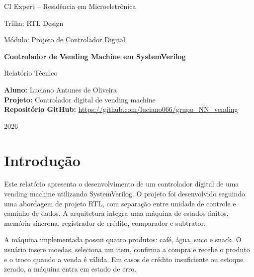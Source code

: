 \documentclass[11pt,a4paper]{article}
\begin{document}
\begin{titlepage}
    \centering

    {\large CI Expert -- Residência em Microeletrônica\par}
    {\large Trilha: RTL Design\par}
    {\large Módulo: Projeto de Controlador Digital\par}

    \vspace{3cm}

    {\LARGE \textbf{Controlador de Vending Machine em SystemVerilog}\par}

    \vspace{1cm}

    {\large Relatório Técnico\par}

    \vfill

    \begin{flushleft}
    \textbf{Aluno:} Luciano Antunes de Oliveira\\
    \textbf{Projeto:} Controlador digital de vending machine\\
    \textbf{Repositório GitHub:} \url{https://github.com/luciano066/grupo_NN_vending}
    \end{flushleft}

    \vfill

    {\large 2026\par}
\end{titlepage}

\tableofcontents
\newpage

\section{Introdução}

Este relatório apresenta o desenvolvimento de um controlador digital de uma vending machine utilizando SystemVerilog. O projeto foi desenvolvido seguindo uma abordagem de projeto RTL, com separação entre unidade de controle e caminho de dados. A arquitetura integra uma máquina de estados finitos, memória síncrona, registrador de crédito, comparador e subtrator.

A máquina implementada possui quatro produtos: café, água, suco e snack. O usuário insere moedas, seleciona um item, confirma a compra e recebe o produto e o troco quando a venda é válida. Em casos de crédito insuficiente ou estoque zerado, a máquina entra em estado de erro.
\end{document}
